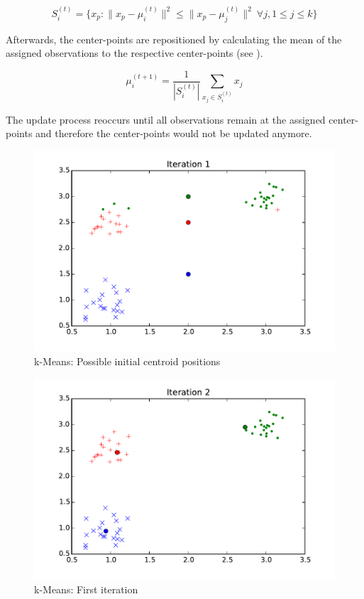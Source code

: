 \begin{equation}
S_i^{(t)} = \big \{ x_p : \big \| x_p - \mu^{(t)}_i \big \|^2 \le \big \| x_p - \mu^{(t)}_j \big \|^2 \ \forall j, 1 \le j \le k \big\}
\label{eqn:kmeans_assign_step}
\end{equation}

Afterwards, the center-points are repositioned by calculating the mean of the assigned observations to the respective center-points (see ).

\begin{equation}
\mu^{(t+1)}_i = \frac{1}{|S^{(t)}_i|} \sum_{x_j \in S^{(t)}_i} x_j
\label{eqn:kmeans_update_step}
\end{equation}

The update process reoccurs until all observations remain at the assigned center-points and therefore the center-points would not be updated anymore.


\begin{figure}
\centering
\includegraphics[width=0.6\linewidth]{img/iteration01}
\caption{k-Means: Possible initial centroid positions}
\label{fig:kmeans:iteration01}
\end{figure}

\begin{figure}
\centering
\includegraphics[width=0.6\linewidth]{img/iteration02}
\caption{k-Means: First iteration}
\label{fig:kmeans:iteration02}
\end{figure}

